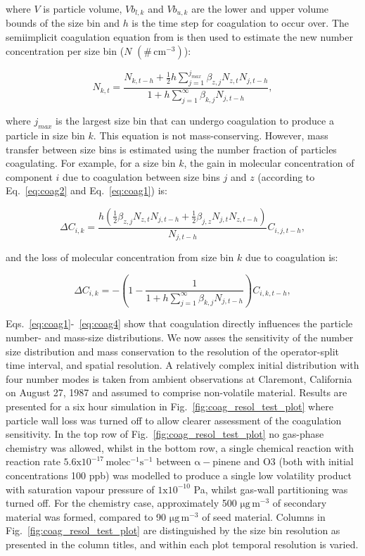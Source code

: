 \documentclass[gmd, manuscript]{copernicus}
\begin{document}
where $V$ is particle volume, $Vb_{l,k}$ and $Vb_{u,k}$ are the lower and upper volume bounds of the size bin and $h$ is the time step for coagulation to occur over.  The semiimplicit coagulation equation from \citet{Jacobson2005} is then used to estimate the new number concentration per size bin ($N$ $(\#\, \mathrm{cm^{-3}})$):

\begin{equation} \label{eq:coag1}
N_{k,t} = \frac{N_{k,t-h}+\frac{1}{2}h\sum_{j=1}^{j_{max}}\beta_{z,j}N_{z,t}N_{j,t-h}}{1+h\sum_{j=1}^{\infty}\beta_{k,j}N_{j,t-h}},
\end{equation}

where $j_{max}$ is the largest size bin that can undergo coagulation to produce a particle in size bin $k$.  This equation is not mass-conserving.  However, mass transfer between size bins is estimated using the number fraction of particles coagulating.  For example, for a size bin $k$, the gain in molecular concentration of component $i$ due to coagulation between size bins $j$ and $z$ (according to Eq.~\ref{eq:coag2} and Eq.~\ref{eq:coag1}) is:

\begin{equation} \label{eq:coag3}
\Delta C_{i,k} = \frac{h(\frac{1}{2}\beta_{z,j}N_{z,t}N_{j,t-h}+\frac{1}{2}\beta_{j,z}N_{j,t}N_{z,t-h})}{N_{j,t-h}}C_{i,j,t-h},
\end{equation}

and the loss of molecular concentration from size bin $k$ due to coagulation is:

\begin{equation} \label{eq:coag4}
\Delta C_{i,k} = -\left(1-\frac{1}{1+h\sum_{j=1}^{\infty}\beta_{k,j}N_{j,t-h}}\right)C_{i,k,t-h},
\end{equation}

Eqs.~\ref{eq:coag1}-~\ref{eq:coag4} show that coagulation directly influences the particle number- and mass-size distributions.  We now asses the sensitivity of the number size distribution and mass conservation to the resolution of the operator-split time interval, and spatial resolution.  A relatively complex initial distribution with four number modes is taken from ambient observations at Claremont, California on August 27, 1987 \citep{Jacobson2005} and assumed to comprise non-volatile material.  Results are presented for a six hour simulation in Fig.~\ref{fig:coag_resol_test_plot} where particle wall loss was turned off to allow clearer assessment of the coagulation sensitivity.  In the top row of Fig.~\ref{fig:coag_resol_test_plot} no gas-phase chemistry was allowed, whilst in the bottom row, a single chemical reaction with reaction rate $\mathrm{5.6x10^{-17}\, molec^{-1}s^{-1}}$  between $\mathrm{\alpha-}$pinene and O3 (both with initial concentrations 100 ppb) was modelled to produce a single low volatility product with saturation vapour pressure of $\mathrm{1x10^{-10}}$ Pa, whilst gas-wall partitioning was turned off.  For the chemistry case, approximately 500 $\mathrm{\mu g\, m^{-3}}$ of secondary material was formed, compared to  90 $\mathrm{\mu g\,m^{-3}}$ of seed material.  Columns in Fig.~\ref{fig:coag_resol_test_plot} are distinguished by the size bin resolution as presented in the column titles, and within each plot temporal resolution is varied.
\end{document}
